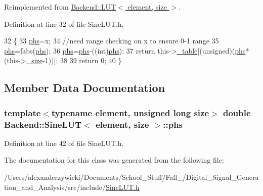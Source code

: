 Reimplemented from \hyperlink{class_backend_1_1_l_u_t_aea3420a7a3552f38ba8f9ea979bab764}{Backend\+::\+L\+U\+T$<$ element, size $>$}.



Definition at line 32 of file Sine\+L\+U\+T.\+h.


\begin{DoxyCode}
32                                                           \{
33             \hyperlink{class_backend_1_1_sine_l_u_t_af5d1e8bc8bda7d41272c17e0f2e9aad8}{phs}=x;
34             \textcolor{comment}{//need range checking on x to ensure 0-1 range}
35             \hyperlink{class_backend_1_1_sine_l_u_t_af5d1e8bc8bda7d41272c17e0f2e9aad8}{phs}=fabs(\hyperlink{class_backend_1_1_sine_l_u_t_af5d1e8bc8bda7d41272c17e0f2e9aad8}{phs});
36             \hyperlink{class_backend_1_1_sine_l_u_t_af5d1e8bc8bda7d41272c17e0f2e9aad8}{phs}=\hyperlink{class_backend_1_1_sine_l_u_t_af5d1e8bc8bda7d41272c17e0f2e9aad8}{phs}-((int)\hyperlink{class_backend_1_1_sine_l_u_t_af5d1e8bc8bda7d41272c17e0f2e9aad8}{phs});
37             \textcolor{keywordflow}{return} this->\hyperlink{class_backend_1_1_l_u_t_ae70f3f0c9aaa9e0b85517d8e2c61d9a5}{\_table}[(unsigned)(\hyperlink{class_backend_1_1_sine_l_u_t_af5d1e8bc8bda7d41272c17e0f2e9aad8}{phs}* (this->\hyperlink{class_backend_1_1_l_u_t_a94d2ce1a7c644ce2d4f8e905790b9b54}{\_size}-1))];
38             
39             \textcolor{keywordflow}{return} 0;
40         \}
\end{DoxyCode}


\subsection{Member Data Documentation}
\hypertarget{class_backend_1_1_sine_l_u_t_af5d1e8bc8bda7d41272c17e0f2e9aad8}{
\subsubsection[{phs}]{\setlength{\rightskip}{0pt plus 5cm}template$<$typename element, unsigned long size$>$ double {\bf Backend\+::\+Sine\+L\+U\+T}$<$ element, size $>$\+::phs\hspace{0.3cm}{\ttfamily [protected]}}}\label{class_backend_1_1_sine_l_u_t_af5d1e8bc8bda7d41272c17e0f2e9aad8}


Definition at line 42 of file Sine\+L\+U\+T.\+h.



The documentation for this class was generated from the following file\+:\begin{DoxyCompactItemize}
\item 
/\+Users/alexanderzywicki/\+Documents/\+School\+\_\+\+Stuff/\+Fall\+\_/\+Digital\+\_\+\+Signal\+\_\+\+Generation\+\_\+and\+\_\+\+Analysis/src/include/\hyperlink{_sine_l_u_t_8h}{Sine\+L\+U\+T.\+h}\end{DoxyCompactItemize}
